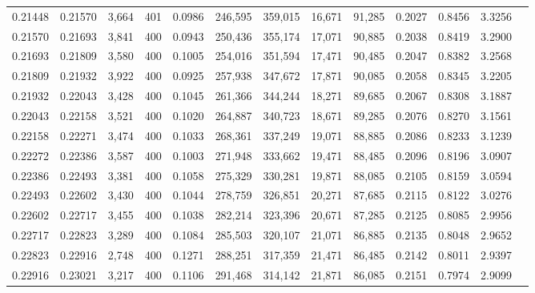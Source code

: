 \begin{tabular}{rrrrrrrrrrrrr}
0.21448 & 0.21570 &  3,664 & 401 &                                     0.0986 & 246,595 & 359,015 &  16,671 &  91,285 & 0.2027 & 0.8456 & 3.3256 \\
0.21570 & 0.21693 &  3,841 & 400 &                                     0.0943 & 250,436 & 355,174 &  17,071 &  90,885 & 0.2038 & 0.8419 & 3.2900 \\
0.21693 & 0.21809 &  3,580 & 400 &                                     0.1005 & 254,016 & 351,594 &  17,471 &  90,485 & 0.2047 & 0.8382 & 3.2568 \\
0.21809 & 0.21932 &  3,922 & 400 &                                     0.0925 & 257,938 & 347,672 &  17,871 &  90,085 & 0.2058 & 0.8345 & 3.2205 \\
0.21932 & 0.22043 &  3,428 & 400 &                                     0.1045 & 261,366 & 344,244 &  18,271 &  89,685 & 0.2067 & 0.8308 & 3.1887 \\
0.22043 & 0.22158 &  3,521 & 400 &                                     0.1020 & 264,887 & 340,723 &  18,671 &  89,285 & 0.2076 & 0.8270 & 3.1561 \\
0.22158 & 0.22271 &  3,474 & 400 &                                     0.1033 & 268,361 & 337,249 &  19,071 &  88,885 & 0.2086 & 0.8233 & 3.1239 \\
0.22272 & 0.22386 &  3,587 & 400 &                                     0.1003 & 271,948 & 333,662 &  19,471 &  88,485 & 0.2096 & 0.8196 & 3.0907 \\
0.22386 & 0.22493 &  3,381 & 400 &                                     0.1058 & 275,329 & 330,281 &  19,871 &  88,085 & 0.2105 & 0.8159 & 3.0594 \\
0.22493 & 0.22602 &  3,430 & 400 &                                     0.1044 & 278,759 & 326,851 &  20,271 &  87,685 & 0.2115 & 0.8122 & 3.0276 \\
0.22602 & 0.22717 &  3,455 & 400 &                                     0.1038 & 282,214 & 323,396 &  20,671 &  87,285 & 0.2125 & 0.8085 & 2.9956 \\
0.22717 & 0.22823 &  3,289 & 400 &                                     0.1084 & 285,503 & 320,107 &  21,071 &  86,885 & 0.2135 & 0.8048 & 2.9652 \\
0.22823 & 0.22916 &  2,748 & 400 &                                     0.1271 & 288,251 & 317,359 &  21,471 &  86,485 & 0.2142 & 0.8011 & 2.9397 \\
0.22916 & 0.23021 &  3,217 & 400 &                                     0.1106 & 291,468 & 314,142 &  21,871 &  86,085 & 0.2151 & 0.7974 & 2.9099 \\

\end{tabular}
